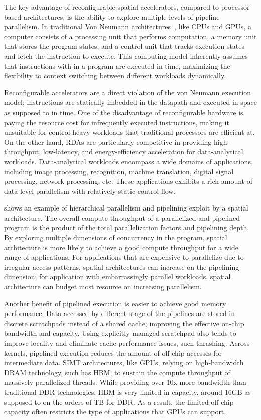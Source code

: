 The key advantage of reconfigurable spatial accelerators, compared to processor-based architectures, 
is the ability to explore multiple levels of pipeline parallelism. 
In traditional Von Neumann architectures~\cite{vonneumann}, like CPUs and GPUs,
a computer consists of a processing unit that performs
computation, a memory unit that stores the program states, and a control unit that tracks execution
states and fetch the instruction to execute. This computing model inherently assumes that
instructions with in a program are executed in time, maximizing the flexibility to 
context switching between different workloads dynamically.

Reconfigurable accelerators are a direct violation of the von Neumann execution model; 
instructions are statically imbedded in the datapath and executed in space as supposed to in time.
One of the disadvantage of reconfigurable hardware is paying the resource cost for infrequently
executed instructions, making it unsuitable for control-heavy workloads that traditional
processors are efficient at.
On the other hand, RDAs are particularly competitive in providing high-throughput, 
low-latency, and energy-efficiency acceleration for data-analytical workloads.
Data-analytical workloads encompass a wide domains of applications, including image processing,
recognition, machine translation, digital signal processing, network processing, etc.
These applications exhibits a rich amount of data-level parallelism with relatively static control
flow.

 shows an example of hierarchical parallelism and pipelining exploit by
a spatial architecture.
The overall compute throughput of a parallelized and pipelined program is 
the product of the total parallelization factors and pipelining depth.
By exploring multiple dimensions of concurrency in the program, spatial architecture is more likely
to achieve a good compute throughput for a wide range of applications.
For applications that are expensive to parallelize due to irregular access patterns, spatial
architectures can increase on the pipelining dimension;
for application with embarrassingly parallel workloads, spatial architecture can budget most
resource on increasing parallelism.

Another benefit of pipelined execution is easier to achieve good memory performance.
Data accessed by different stage of the pipelines are stored in discrete scratchpads 
instead of a shared cache; improving the effective on-chip bandwidth and capacity.
Using explicitly managed scratchpad also tends to improve locality and 
eliminate cache performance issues, such thrashing.
Across kernels, pipelined execution reduces the amount of off-chip accesses for intermediate
data.
SIMT architectures, like GPUs, relying on high-bandwidth DRAM technology, such has HBM, to sustain
the compute throughput of massively parallelized threads.
While providing over 10x more bandwidth than traditional DDR technologies, HBM is very limited in
capacity, around 16GB as supposed to on the orders of TB for DDR.
As a result, the limited off-chip capacity often restricts the type of applications that
GPUs can support.

